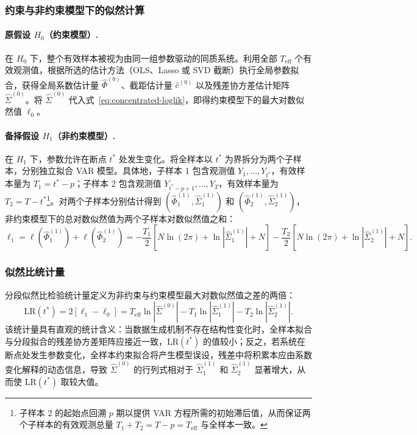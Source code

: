 \subsubsection{约束与非约束模型下的似然计算}

\paragraph{原假设 $H_0$（约束模型）.}
在 $H_0$ 下，整个有效样本被视为由同一组参数驱动的同质系统。利用全部 $T_{\text{eff}}$ 个有效观测值，根据所选的估计方法（OLS、Lasso 或 SVD 截断）执行全局参数拟合，获得全局系数估计量 $\hat{\Phi}^{(0)}$、截距估计量 $\hat{c}^{(0)}$ 以及残差协方差估计矩阵 $\hat{\Sigma}^{(0)}$。将 $\hat{\Sigma}^{(0)}$ 代入式~\eqref{eq:concentrated-loglik}，即得约束模型下的最大对数似然值 $\ell_0$。

\paragraph{备择假设 $H_1$（非约束模型）.}
在 $H_1$ 下，参数允许在断点 $t^*$ 处发生变化。将全样本以 $t^*$ 为界拆分为两个子样本，分别独立拟合 VAR 模型。具体地，子样本 1 包含观测值 $Y_1, \ldots, Y_{t^*}$，有效样本量为 $T_1 = t^* - p$；子样本 2 包含观测值 $Y_{t^*-p+1}, \ldots, Y_T$，有效样本量为 $T_2 = T - t^*$\footnote{子样本 2 的起始点回溯 $p$ 期以提供 VAR 方程所需的初始滞后值，从而保证两个子样本的有效观测总量 $T_1 + T_2 = T - p = T_{\text{eff}}$ 与全样本一致。}。对两个子样本分别估计得到 $(\hat{\Phi}_1^{(1)}, \hat{\Sigma}_1^{(1)})$ 和 $(\hat{\Phi}_2^{(1)}, \hat{\Sigma}_2^{(1)})$，非约束模型下的总对数似然值为两个子样本对数似然值之和：
\begin{equation}\label{eq:loglik-h1}
    \ell_1 = \ell(\hat{\Phi}_1^{(1)}) + \ell(\hat{\Phi}_2^{(1)}) = -\frac{T_1}{2}\left[N\ln(2\pi) + \ln|\hat{\Sigma}_1^{(1)}| + N\right] - \frac{T_2}{2}\left[N\ln(2\pi) + \ln|\hat{\Sigma}_2^{(1)}| + N\right].
\end{equation}

\subsubsection{似然比统计量}

分段似然比检验统计量定义为非约束与约束模型最大对数似然值之差的两倍：
\begin{equation}\label{eq:lr-statistic}
    \mathrm{LR}(t^*) = 2\left[\ell_1 - \ell_0\right] = T_{\text{eff}} \ln|\hat{\Sigma}^{(0)}| - T_1 \ln|\hat{\Sigma}_1^{(1)}| - T_2 \ln|\hat{\Sigma}_2^{(1)}|.
\end{equation}
该统计量具有直观的统计含义：当数据生成机制不存在结构性变化时，全样本拟合与分段拟合的残差协方差矩阵应接近一致，$\mathrm{LR}(t^*)$ 的值较小；反之，若系统在断点处发生参数变化，全样本约束拟合将产生模型误设，残差中将积累本应由系数变化解释的动态信息，导致 $\hat{\Sigma}^{(0)}$ 的行列式相对于 $\hat{\Sigma}_1^{(1)}$ 和 $\hat{\Sigma}_2^{(1)}$ 显著增大，从而使 $\mathrm{LR}(t^*)$ 取较大值。


